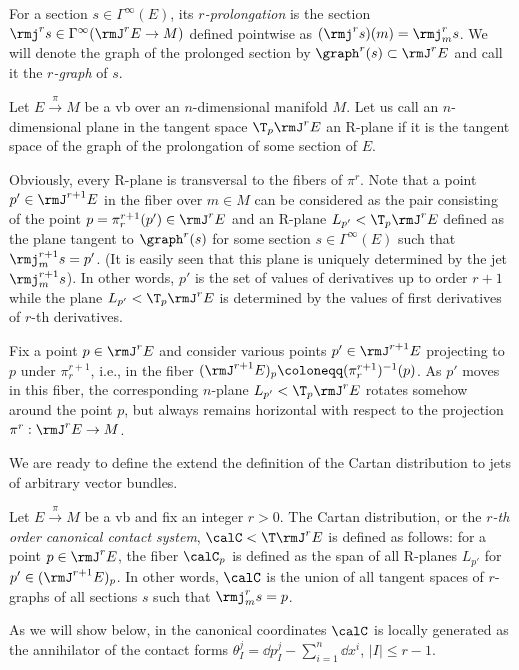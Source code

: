For a section $s\in \Gamma^\infty(E)$, its \emph{$r$-prolongation} is the section $\rmj^r s\in \Gamma^\infty(\rmJ^rE\to M)$ defined pointwise as $(\rmj^r s)(m)=\rmj_m^r s$. We will denote the graph of the prolonged section by $\graph^r(s)\subset \rmJ^rE$ and call it the \emph{$r$-graph} of $s$.

\begin{defn}[R-plane]
    Let $E\overset{\pi}{\to}M$ be a \gls{vb} over an $n$-dimensional manifold $M$. Let us call an $n$-dimensional plane in the tangent space $\T_p \rmJ^rE$ an R-plane if it is the tangent space of the graph of the prolongation of some section of $E$.
\end{defn}

Obviously, every R-plane is transversal to the fibers of $\pi^r$. Note that a point $p'\in \rmJ^{r+1}E$ in the fiber over $m\in M$ can be considered as the pair consisting of the point $p=\pi^{r+1}_r(p')\in \rmJ^rE$ and an R-plane $L_{p'}<\T_p \rmJ^rE$ defined as the plane tangent to $\graph^r(s)$ for some section $s\in\Gamma^\infty(E)$ such that $\rmj^{r+1}_m s=p'$. (It is easily seen that this plane is uniquely determined by the jet $\rmj^{r+1}_m s$). In other words, $p'$ is the set of values of derivatives up to order $r+1$ while the plane $L_{p'}<\T_p \rmJ^rE$ is determined by the values of first derivatives of $r$-th derivatives.

Fix a point $p\in \rmJ^rE$ and consider various points $p'\in \rmJ^{r+1}E$ projecting to $p$ under $\pi^{r+1}_r$, i.e., in the fiber $(\rmJ^{r+1}E)_p\coloneqq (\pi^{r+1}_r)^{-1}(p)$. As $p'$ moves in this fiber, the corresponding $n$-plane $L_{p'}<\T_p\rmJ^rE$ rotates somehow around the point $p$, but always remains horizontal with respect to the projection $\pi^r:\rmJ^rE\to M$.

We are ready to define the extend the definition of the Cartan distribution to jets of arbitrary vector bundles.

\begin{defn}
    Let $E\overset{\pi}{\to} M$ be a \gls{vb} and fix an integer $r>0$. The Cartan distribution, or the \emph{$r$-th order canonical contact system}, $\calC<\T \rmJ^rE$ is defined as follows: for a point $p\in \rmJ^rE$, the fiber $\calC_p$ is defined as the span of all R-planes $L_{p'}$ for $p'\in (\rmJ^{r+1}E)_p$. In other words, $\calC$ is the union of all tangent spaces of $r$-graphs of all sections $s$ such that $\rmj^r_m s=p$.

    As we will show below, in the canonical coordinates $\calC$ is locally generated as the annihilator of the contact forms $\theta^j_I=\dd p^j_I-\sum_{i=1}^n \dd x^i$, $|I|\leq r-1$.
\end{defn}

